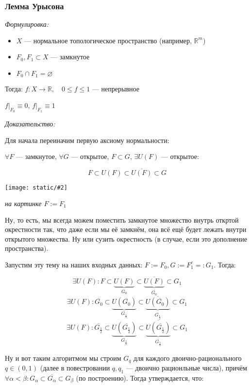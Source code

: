 \documentclass{article}
\def\images#1#2{\begin{center}\texttt{[image: static/\#2]}\end{center}}
\begin{document}
\subsubsection{Лемма Урысона}
\textit{Формулировка:}

\begin{itemize}
    \item $X$ --- нормальное топологическое пространство (например, $\mathbb{R}^m$)
    \item $F_0, F_1 \subset X$ --- замкнутое
    \item $F_0 \cap F_1 = \varnothing$
\end{itemize}

Тогда: $f: X \rightarrow \mathbb{R}, \quad 0 \le f \le 1$ --- непрерывное

$f|_{F_0} \equiv 0$, $f|_{F_1} \equiv 1$

\textit{Доказательство:}

Для начала переиначим первую аксиому нормальности: 

$\forall F$ --- замкнутое, $\forall G$ --- открытое, $F \subset G$, $\exists U(F)$ --- открытое: 

\[F \subset U(F) \subset \overline{U(F)} \subset G\]

\images{0.5}{uryhson.jpg}

\textit{на картинке $F := F_1$}

Ну, то есть, мы всегда можем поместить замкнутое множество внутрь откртой окрестности так, что даже если мы её замкнём, она всё ещё будет лежать внутри открытого множества. Ну или сузить окрестность (в случае, если это дополнение пространства).

Запустим эту тему на наших входных данных: $F := F_0, G := F^c_1 =: G_1$. Тогда:

\[\exists U(F): F \subset \underbrace{U(F)}_{G_0} \subset \underbrace{\overline{U(F)}}_{\overline{G_0}} \subset G_1\]
\[\exists U(F): \overline{G_0} \subset \underbrace{U(\overline{G_0})}_{G_{\frac{1}{2}}} \subset \underbrace{\overline{U(\overline{G_0})}}_{\overline{G_{\frac{1}{2}}}} \subset G_1\]
\[\exists U(F): \overline{G_{\frac{1}{2}}} \subset \underbrace{U(\overline{G_{\frac{1}{2}}})}_{G_{\frac{3}{4}}} \subset \underbrace{\overline{U(\overline{G_{\frac{1}{2}}})}}_{\overline{G_{\frac{3}{4}}}} \subset G_1\]

Ну и вот таким алгоритмом мы строим $G_q$ для каждого двоично-рационального $q \in (0, 1)$ (далее в повестровании $q, q_1$ --- двоично рационльные числа), причём $\forall \alpha < \beta: G_{\alpha} \subset \overline{G_{\alpha}} \subset G_{\beta}$ (по построению). Тогда утверждается, что:
\end{document}
